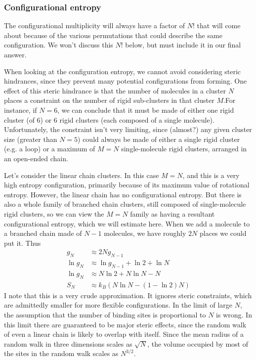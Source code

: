 \documentclass[letterpaper,twocolumn,amsmath,amssymb,pre]{revtex4-1}
\begin{document}
\subsubsection{Configurational entropy}

The configurational multiplicity will always have a factor of $N!$
that will come about because of the various permutations that could
describe the same configuration.  We won't discuss this $N!$ below,
but must include it in our final answer.

When looking at the configuration entropy, we cannot avoid considering
steric hindrances, since they prevent many potential configurations
from forming.  One effect of this steric hindrance is that the number
of molecules in a cluster $N$ places a constraint on the number of
rigid sub-clusters in that cluster $M$.For instance, if $N = 6$, we
can conclude that it must be made of either one rigid cluster (of 6)
or 6 rigid clusters (each composed of a single molecule).
Unfortunately, the constraint isn't very limiting, since (almost?) any
given cluster size (greater than $N=5$) could always be made of either
a single rigid cluster (e.g. a loop) or a maximum of $M=N$
single-molecule rigid clusters, arranged in an open-ended chain.

Let's consider the linear chain clusters.  In this case $M=N$, and
this is a very high entropy configuration, primarily because of its
maximum value of rotational entropy.  However, the linear chain has no
configurational entropy.  But there is also a whole family of branched
chain clusters, still composed of single-molecule rigid clusters, so
we can view the $M=N$ family as having a resultant configurational
entropy, which we will estimate here.  When we add a molecule to a
branched chain made of $N-1$ molecules, we have roughly $2N$ places
we could put it.  Thus
\begin{align}
  g_N &\approx 2N g_{N-1} \\
  \ln g_N &\approx \ln g_{N-1} + \ln 2 + \ln N \\
  \ln g_N &\approx N\ln 2 + N\ln N - N \\
  S_N &\approx k_B\left(N\ln N - (1-\ln 2)N \right)
\end{align}
I note that this is a very crude approximation.  It ignores steric
constraints, which are admittedly smaller for more flexible
configurations.  In the limit of large $N$, the assumption that the
number of binding sites is proportional to $N$ is wrong.  In this
limit there are guaranteed to be major steric effects, since the
random walk of even a linear chain is likely to overlap with itself.
Since the mean radius of a random walk in three dimensions scales as
$\sqrt{N}$, the volume occupied by most of the sites in the random
walk scales as $N^{3/2}$.
\end{document}
